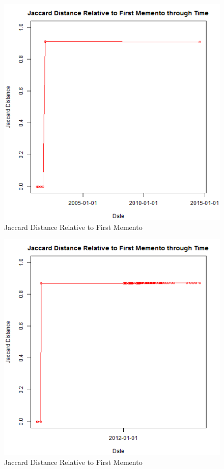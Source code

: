 \documentclass[12pt]{Report}
\begin{document}
\begin{figure}[ht]    
    \begin{center}
        \includegraphics[scale=0.60]{link8.png}
        \caption{Jaccard Distance Relative to First Memento }
        \label{Jaccard Distance Relative to First Memento}
    \end{center}
\end{figure}
\newpage

\begin{figure}[ht]    
    \begin{center}
        \includegraphics[scale=0.60]{link10.png}
        \caption{Jaccard Distance Relative to First Memento }
        \label{Jaccard Distance Relative to First Memento}
    \end{center}
\end{figure}
\newpage
\end{document}
